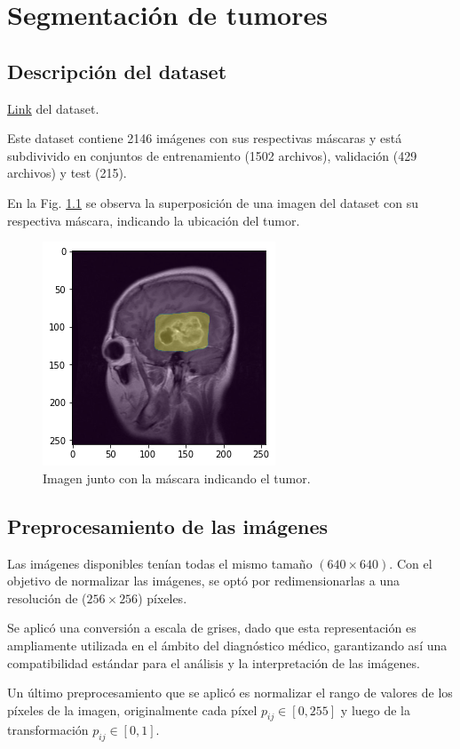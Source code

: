 
\chapter{Segmentación de tumores}

\section{Descripción del dataset}

\href{https://www.kaggle.com/datasets/pkdarabi/brain-tumor-image-dataset-semantic-segmentation} {Link} del dataset. 

Este dataset contiene 2146 imágenes con sus respectivas máscaras y está subdivivido en conjuntos de entrenamiento (1502 archivos), validación (429 archivos) y test (215).

 En la Fig. \ref{fig.mask} se observa la superposición de una imagen del dataset con su respectiva máscara, indicando la ubicación del tumor.
 
 
\begin{figure}[H]
\centering
        \includegraphics[width=0.3\linewidth]{chapters/segmentacion/images/mask.png}
        \caption{Imagen junto con la máscara indicando el tumor.}
        \label{fig.mask}
  \end{figure}


\section{Preprocesamiento de las imágenes}

Las imágenes disponibles tenían todas el mismo tamaño $(640\times640)$. Con el objetivo de normalizar las imágenes, se optó por redimensionarlas a una resolución de ($256 \times 256$) píxeles. 

Se aplicó una conversión a escala de grises, dado que esta representación es ampliamente utilizada en el ámbito del diagnóstico médico, garantizando así una compatibilidad estándar para el análisis y la interpretación de las imágenes.

Un último preprocesamiento que se aplicó es normalizar el rango de valores de los píxeles de la imagen, originalmente cada píxel $p_{ij}\in [0,255]$ y luego de la transformación $p_{ij}\in [0,1]$.

